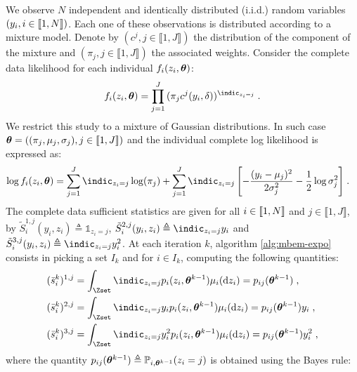 \begin{exmp}
We observe $N$ independent and identically distributed (i.i.d.) random variables $ (y_i, i \in \llbracket1,N\rrbracket)$. Each one of these observations is distributed according to a mixture model. Denote by $(c^j, j \in \llbracket 1, J \rrbracket)$ the distribution of the component of the mixture and $(\pi_j, j \in \llbracket 1, J \rrbracket)$ the associated weights. Consider the complete data likelihood for each individual $f_i( z_i, \bm{\theta})$:
\begin{align} \label{eq1}
f_i( z_i, \prm) = \prod_{j=1}^{J}{(\pi_j c^j(y_i,\delta))^{\indic_{z_i=j}}}\eqs.
\end{align}
We restrict this study to a mixture of Gaussian distributions. In such case $\bm{\theta} = ((\pi_j, \mu_j, \sigma_j), j \in \llbracket 1, J \rrbracket)$ and the individual complete log likelihood is expressed as:
\begin{align}
\log f_i( z_i, \prm) & = \sum_{j=1}^{J}{\indic_{z_i=j}\log(\pi_j)} + \sum_{j=1}^{J}{\indic_{z_i=j}\left[-\frac{(y_i - \mu_j)^2}{2\sigma^2_j} - \frac{1}{2}\log \sigma^2_j\right]}\eqs.
\end{align}
The complete data sufficient statistics are given for all $i \in \llbracket1,N\rrbracket$ and $j \in \llbracket1,J\rrbracket$, by $\tilde{S}_i^{1,j}(y_i,z_i) \triangleq \mathbb{1}_{z_i=j}$, $\tilde{S}_i^{2,j}(y_i,z_i) \triangleq \indic_{z_i=j}y_i$ and $\tilde{S}_i^{3,j}(y_i,z_i) \triangleq \indic_{z_i=j}y_i^2$.
At each iteration $k$, algorithm \ref{alg:mbem-expo} consists in picking a set $I_k$ and for $i \in I_k$, computing the following quantities:
\begin{align}
& (\bar{s}_i^k)^{1,j} = \int_{\Zset}{\indic_{z_i=j}p_i(z_i,\prm^{k-1}) \mu_i(\dz_i)} = p_{ij}(\prm^{k-1})\eqs,\\
& (\bar{s}_i^k)^{2,j} = \int_{\Zset}{\indic_{z_i=j}y_ip_i(z_i,\prm^{k-1}) \mu_i(\dz_i)} = p_{ij}(\prm^{k-1})y_i\eqs,\\
& (\bar{s}_i^k)^{3,j} = \int_{\Zset}{\indic_{z_i=j}y_i^2p_i(z_i,\prm^{k-1}) \mu_i(\dz_i)} = p_{ij}(\prm^{k-1})y_i^2\eqs,
\end{align}
where the quantity $p_{ij}(\bm{\theta}^{k-1}) \triangleq \mathbb{P}_{i,\bm{\theta}^{k-1}}(z_i = j)$ is obtained using the Bayes rule:

\end{exmp}
